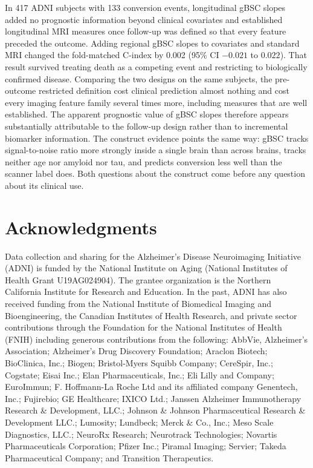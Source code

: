 \documentclass[blue]{ludusofficial}  %
\begin{document}
In 417 ADNI subjects with 133 conversion events, longitudinal gBSC slopes added no prognostic information beyond clinical covariates and established longitudinal MRI measures once follow-up was defined so that every feature preceded the outcome. Adding regional gBSC slopes to covariates and standard MRI changed the fold-matched C-index by 0.002 (95\% CI $-0.021$ to $0.022$). That result survived treating death as a competing event and restricting to biologically confirmed disease. Comparing the two designs on the same subjects, the pre-outcome restricted definition cost clinical prediction almost nothing and cost every imaging feature family several times more, including measures that are well established. The apparent prognostic value of gBSC slopes therefore appears substantially attributable to the follow-up design rather than to incremental biomarker information. The construct evidence points the same way: gBSC tracks signal-to-noise ratio more strongly inside a single brain than across brains, tracks neither age nor amyloid nor tau, and predicts conversion less well than the scanner label does. Both questions about the construct come before any question about its clinical use.

\section*{Acknowledgments}

Data collection and sharing for the Alzheimer's Disease Neuroimaging Initiative (ADNI) is funded by the National Institute on Aging (National Institutes of Health Grant U19AG024904). The grantee organization is the Northern California Institute for Research and Education. In the past, ADNI has also received funding from the National Institute of Biomedical Imaging and Bioengineering, the Canadian Institutes of Health Research, and private sector contributions through the Foundation for the National Institutes of Health (FNIH) including generous contributions from the following: AbbVie, Alzheimer's Association; Alzheimer's Drug Discovery Foundation; Araclon Biotech; BioClinica, Inc.; Biogen; Bristol-Myers Squibb Company; CereSpir, Inc.; Cogstate; Eisai Inc.; Elan Pharmaceuticals, Inc.; Eli Lilly and Company; EuroImmun; F. Hoffmann-La Roche Ltd and its affiliated company Genentech, Inc.; Fujirebio; GE Healthcare; IXICO Ltd.; Janssen Alzheimer Immunotherapy Research \& Development, LLC.; Johnson \& Johnson Pharmaceutical Research \& Development LLC.; Lumosity; Lundbeck; Merck \& Co., Inc.; Meso Scale Diagnostics, LLC.; NeuroRx Research; Neurotrack Technologies; Novartis Pharmaceuticals Corporation; Pfizer Inc.; Piramal Imaging; Servier; Takeda Pharmaceutical Company; and Transition Therapeutics.
\end{document}

